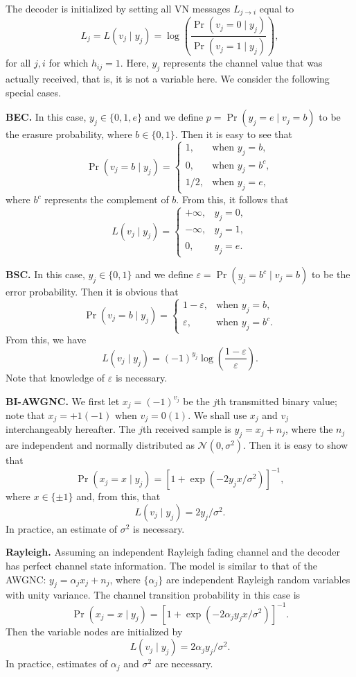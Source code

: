 \documentclass[11pt]{article}
\begin{document}
The decoder is initialized by setting all VN messages $L_{j \to i}$ equal to
\[
L_j = L(v_j \mid y_j) = \log\left(\frac{\Pr(v_j = 0 \mid y_j)}{\Pr(v_j = 1 \mid y_j)}\right),
\]
for all $j,i$ for which $h_{ij} = 1$. Here, $y_j$ represents the channel value that was actually received, that is, it is not a variable here. We consider the following special cases.

\textbf{BEC.} In this case, $y_j \in \{0,1,e\}$ and we define $p = \Pr(y_j = e \mid v_j = b)$ to be the erasure probability, where $b \in \{0,1\}$. Then it is easy to see that
\[
\Pr(v_j = b \mid y_j) =
\begin{cases}
1, & \text{when } y_j = b, \\
0, & \text{when } y_j = b^c, \\
1/2, & \text{when } y_j = e,
\end{cases}
\]
where $b^c$ represents the complement of $b$. From this, it follows that
\[
L(v_j \mid y_j) =
\begin{cases}
+\infty, & y_j = 0, \\
-\infty, & y_j = 1, \\
0, & y_j = e.
\end{cases}
\]

\textbf{BSC.} In this case, $y_j \in \{0,1\}$ and we define $\varepsilon = \Pr(y_j = b^c \mid v_j = b)$ to be the error probability. Then it is obvious that
\[
\Pr(v_j = b \mid y_j) =
\begin{cases}
1-\varepsilon, & \text{when } y_j = b, \\
\varepsilon, & \text{when } y_j = b^c.
\end{cases}
\]
From this, we have
\[
L(v_j \mid y_j) = (-1)^{y_j}\log\left(\frac{1-\varepsilon}{\varepsilon}\right).
\]
Note that knowledge of $\varepsilon$ is necessary.

\textbf{BI-AWGNC.} We first let $x_j = (-1)^{v_j}$ be the $j$th transmitted binary value; note that $x_j = +1(-1)$ when $v_j = 0(1)$. We shall use $x_j$ and $v_j$ interchangeably hereafter. The $j$th received sample is $y_j = x_j + n_j$, where the $n_j$ are independent and normally distributed as $\mathcal{N}(0,\sigma^2)$. Then it is easy to show that
\[
\Pr(x_j = x \mid y_j) = \left[1 + \exp\left(-2y_jx/\sigma^2\right)\right]^{-1},
\]
where $x \in \{\pm 1\}$ and, from this, that
\[
L(v_j \mid y_j) = 2y_j/\sigma^2.
\]
In practice, an estimate of $\sigma^2$ is necessary.

\textbf{Rayleigh.} Assuming an independent Rayleigh fading channel and the decoder has perfect channel state information. The model is similar to that of the AWGNC: $y_j= \alpha_j x_j + n_j$, where $\{ \alpha_j \}$ are independent Rayleigh random variables with unity variance. The channel transition probability in this case is
\[
\Pr(x_j = x \mid y_j) = \left[1 + \exp\left(-2\alpha_j y_j x/\sigma^2\right)\right]^{-1}.
\]
Then the variable nodes are initialized by
\[
L(v_j \mid y_j) = 2\alpha_j y_j/\sigma^2.
\]
In practice, estimates of $\alpha_j$ and $\sigma^2$ are necessary.
\end{document}
